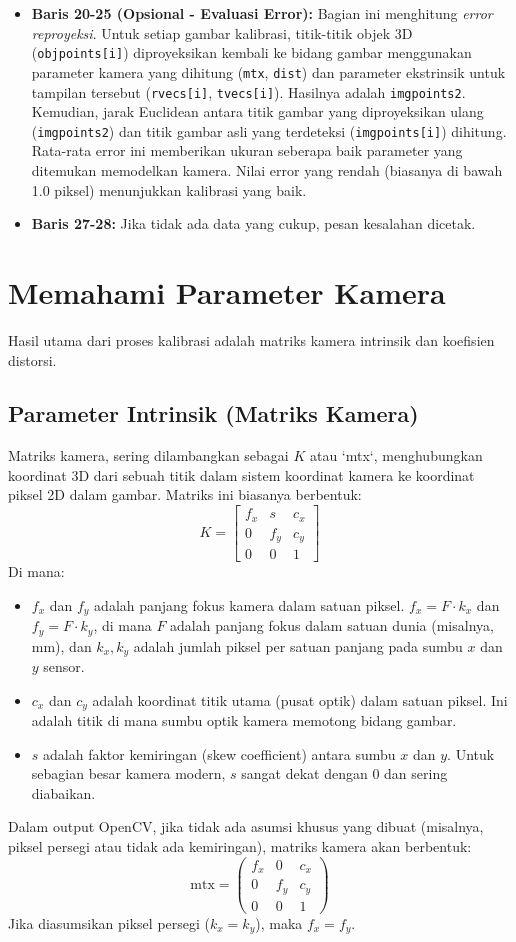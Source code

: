 \documentclass[12pt,a4paper]{article}
\begin{document}
\begin{itemize}
    \item \textbf{Baris 20-25 (Opsional - Evaluasi Error):} Bagian ini menghitung \textit{error reproyeksi}. Untuk setiap gambar kalibrasi, titik-titik objek 3D (\texttt{objpoints[i]}) diproyeksikan kembali ke bidang gambar menggunakan parameter kamera yang dihitung (\texttt{mtx}, \texttt{dist}) dan parameter ekstrinsik untuk tampilan tersebut (\texttt{rvecs[i]}, \texttt{tvecs[i]}). Hasilnya adalah \texttt{imgpoints2}. Kemudian, jarak Euclidean antara titik gambar yang diproyeksikan ulang (\texttt{imgpoints2}) dan titik gambar asli yang terdeteksi (\texttt{imgpoints[i]}) dihitung. Rata-rata error ini memberikan ukuran seberapa baik parameter yang ditemukan memodelkan kamera. Nilai error yang rendah (biasanya di bawah 1.0 piksel) menunjukkan kalibrasi yang baik.
    \item \textbf{Baris 27-28:} Jika tidak ada data yang cukup, pesan kesalahan dicetak.
\end{itemize}
\section{Memahami Parameter Kamera}
Hasil utama dari proses kalibrasi adalah matriks kamera intrinsik dan koefisien
distorsi.

\subsection{Parameter Intrinsik (Matriks Kamera)}
Matriks kamera, sering dilambangkan sebagai $K$ atau `mtx`, menghubungkan
koordinat 3D dari sebuah titik dalam sistem koordinat kamera ke koordinat
piksel 2D dalam gambar. Matriks ini biasanya berbentuk: $$ K = \begin{bmatrix} f_x & s & c_x \\ 0 & f_y & c_y \\ 0 & 0 & 1 \end{bmatrix} $$
Di mana:
\begin{itemize}
    \item $f_x$ dan $f_y$ adalah panjang fokus kamera dalam satuan piksel. $f_x = F \cdot k_x$ dan $f_y = F \cdot k_y$, di mana $F$ adalah panjang fokus dalam satuan dunia (misalnya, mm), dan $k_x, k_y$ adalah jumlah piksel per satuan panjang pada sumbu $x$ dan $y$ sensor.
    \item $c_x$ dan $c_y$ adalah koordinat titik utama (pusat optik) dalam satuan piksel. Ini adalah titik di mana sumbu optik kamera memotong bidang gambar.
    \item $s$ adalah faktor kemiringan (skew coefficient) antara sumbu $x$ dan $y$. Untuk sebagian besar kamera modern, $s$ sangat dekat dengan 0 dan sering diabaikan.
\end{itemize}
Dalam output OpenCV, jika tidak ada asumsi khusus yang dibuat (misalnya, piksel persegi atau tidak ada kemiringan), matriks kamera akan berbentuk:
$$ \text{mtx} = \begin{pmatrix} f_x & 0 & c_x \\ 0 & f_y & c_y \\ 0 & 0 & 1 \end{pmatrix} $$
Jika diasumsikan piksel persegi ($k_x = k_y$), maka $f_x = f_y$.
\end{document}
